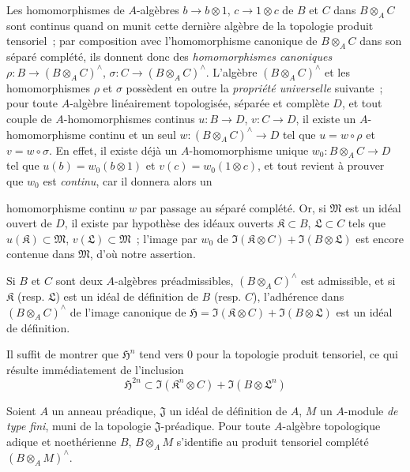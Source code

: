 \begin{env}[7.7.6]
\label{0.7.7.6-fr}
Les homomorphismes de $A$-algèbres $b\to b\otimes 1$,
$c\to 1\otimes c$ de $B$ et $C$ dans $B\otimes_A C$ sont continus
quand on munit cette dernière algèbre de la topologie produit tensoriel~;
par composition avec l'homomorphisme canonique de $B\otimes_A C$ dans son
séparé complété, ils donnent donc des \emph{homomorphismes canoniques}
$\rho:B\to(B\otimes_A C)^\wedge$, $\sigma:C\to(B\otimes_A C)^\wedge$.
L'algèbre $(B\otimes_A C)^\wedge$ et les homomorphismes $\rho$ et $\sigma$
possèdent en outre la \emph{propriété universelle} suivante~; pour toute
$A$-algèbre linéairement topologisée, séparée et complète $D$, et tout
couple de $A$-homomorphismes continus $u:B\to D$, $v:C\to D$, il existe un
$A$-homomorphisme continu et un seul
$w:(B\otimes_A C)^\wedge\to D$ tel que $u=w\circ\rho$ et
$v=w\circ\sigma$. En effet, il existe déjà un $A$-homomorphisme unique
$w_0:B\otimes_A C\to D$ tel que $u(b)=w_0(b\otimes 1)$ et
$v(c)=w_0(1\otimes c)$, et tout revient à prouver que $w_0$ est \emph{continu},
car il donnera alors un


homomorphisme continu $w$ par passage au séparé complété. Or, si
$\mathfrak M$ est un idéal ouvert de $D$, il existe par hypothèse des idéaux
ouverts $\mathfrak K\subset B$, $\mathfrak L\subset C$ tels que
$u(\mathfrak K)\subset\mathfrak M$, $v(\mathfrak L)\subset\mathfrak M$~;
l'image par $w_0$ de
$\Im(\mathfrak K\otimes C)+\Im(B\otimes\mathfrak L)$ est encore
contenue dans $\mathfrak M$, d'où notre assertion.
\end{env}

\begin{proposition}[7.7.7]
\label{0.7.7.7-fr}
Si $B$ et $C$ sont deux $A$-algèbres préadmissibles,
$(B\otimes_A C)^\wedge$ est admissible, et si $\mathfrak K$ \textup{(resp.
$\mathfrak L$)} est un idéal de définition de $B$ \textup{(resp. $C$)}, l'adhérence
dans $(B\otimes_A C)^\wedge$ de l'image canonique de
$\mathfrak H=\Im(\mathfrak K\otimes C)+\Im(B\otimes\mathfrak L)$ est
un idéal de définition.
\end{proposition}

Il suffit de montrer que $\mathfrak H^n$ tend vers $0$ pour la topologie
produit tensoriel, ce qui résulte immédiatement de l'inclusion
\[
  \mathfrak H^{2n}\subset
  \Im(\mathfrak K^n\otimes C)+\Im(B\otimes\mathfrak L^n)
\]

\begin{proposition}[7.7.8]
\label{0.7.7.8-fr}
Soient $A$ un anneau préadique, $\mathfrak J$ un idéal de définition de
$A$, $M$ un $A$-module \emph{de type fini}, muni de la topologie
$\mathfrak J$-préadique. Pour toute $A$-algèbre topologique adique et
noethérienne $B$, $B\otimes_A M$ s'identifie au produit tensoriel complété
$(B\otimes_A M)^\wedge$.
\end{proposition}

